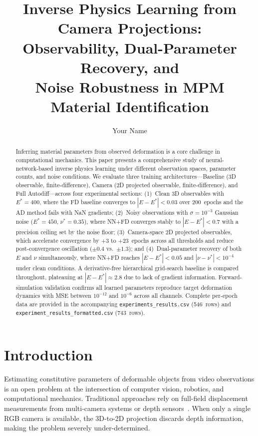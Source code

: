 \documentclass{article}
\title{Inverse Physics Learning from Camera Projections:\\Observability, Dual-Parameter Recovery, and\\Noise Robustness in MPM Material Identification}
\author{Your Name}
\begin{document}
\maketitle

\begin{abstract}
Inferring material parameters from observed deformation is a core challenge
in computational mechanics.  This paper presents a comprehensive study of
neural-network-based inverse physics learning under different observation
spaces, parameter counts, and noise conditions.  We evaluate three training
architectures---Baseline (3D observable, finite-difference), Camera (2D
projected observable, finite-difference), and Full Autodiff---across four
experimental sections: (1)~Clean 3D observables with $E^*=400$, where the
FD baseline converges to $|E-E^*|<0.03$ over 200~epochs and the AD method
fails with NaN gradients; (2)~Noisy observations with $\sigma=10^{-3}$
Gaussian noise ($E^*=450$, $\nu^*=0.35$), where NN+FD converges stably
to $|E-E^*|<0.7$ with a precision ceiling set by the noise floor;
(3)~Camera-space 2D projected observables, which accelerate convergence
by $+3$ to $+23$~epochs across all thresholds and reduce post-convergence
oscillation ($\pm0.4$ vs.\ $\pm1.3$); and (4)~Dual-parameter recovery of
both $E$ and $\nu$ simultaneously, where NN+FD reaches $|E-E^*|<0.05$
and $|\nu-\nu^*|<10^{-4}$ under clean conditions.  A derivative-free
hierarchical grid-search baseline is compared throughout, plateauing at
$|E-E^*|\approx2.8$ due to lack of gradient information.  Forward-
simulation validation confirms all learned parameters reproduce target
deformation dynamics with MSE between $10^{-12}$ and $10^{-6}$ across
all channels.  Complete per-epoch data are provided in the accompanying
\texttt{experiments\_results.csv} (546~rows) and
\texttt{experiment\_results\_formatted.csv} (743~rows).
\end{abstract}


\section{Introduction}

Estimating constitutive parameters of deformable objects from video
observations is an open problem at the intersection of computer vision,
robotics, and computational mechanics.  Traditional approaches rely on
full-field displacement measurements from multi-camera systems or depth
sensors~\cite{greenwade93}.  When only a single RGB camera is available,
the 3D-to-2D projection discards depth information, making the problem
severely under-determined.
\end{document}
